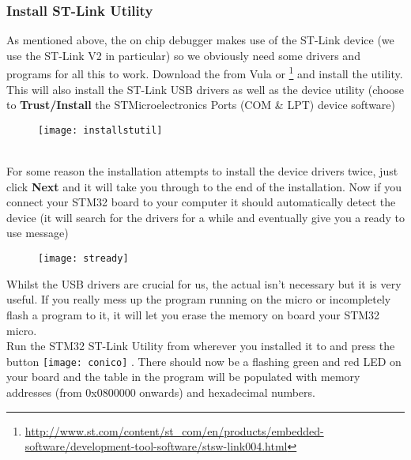 \subsubsection{Install ST-Link Utility}
\label{subsec:stlink}
As mentioned above, the on chip debugger makes use of the ST-Link device (we use the ST-Link V2 in particular) so we obviously need some drivers and programs for all this to work. 
Download the \href{https://vula.uct.ac.za/x/8LNN3V}{\color{Blue}\underline{}} from Vula or \href{http://www.st.com/content/st_com/en/products/embedded-software/development-tool-software/stsw-link004.html}{\color{Blue}\underline{}}\hspace{1pt}\footnote{\url{http://www.st.com/content/st_com/en/products/embedded-software/development-tool-software/stsw-link004.html}} and install the utility. This will also install the ST-Link USB drivers as well as the device utility (choose to \textbf{\color{Purple} Trust/Install} the STMicroelectronics Ports (COM \& LPT) device software)
\\
\begin{figure}[htbp]
\centering
\texttt{[image: installstutil]}
\end{figure}
\\
For some reason the installation attempts to install the device drivers twice, just click \textbf{\color{Purple} Next} and it will take you through to the end of the installation. Now if you connect your STM32 board to your computer it should automatically detect the device (it will search for the drivers for a while and eventually give you a ready to use message)
\\
\begin{figure}[hbtp]
\centering
\texttt{[image: stready]}
\end{figure}
\parindent=0pt
\par
Whilst the USB drivers are crucial for us, the actual  isn't necessary but it is very useful. If you really mess up the program running on the micro or incompletely flash a program to it, it will let you erase the memory on board your STM32 micro.
\\
Run the STM32 ST-Link Utility from wherever you installed it to and press the  button 
\texttt{[image: conico]}
. There should now be a flashing green and red LED on your board and the table in the program will be populated with memory addresses (from 0x0800000 onwards) and hexadecimal numbers.
